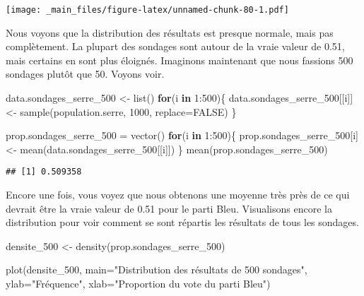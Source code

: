 \documentclass[
]{book}
\newenvironment{Shaded}{\begin{snugshade}}{\end{snugshade}}
\newcommand{\AttributeTok}[1]{\textcolor[rgb]{0.77,0.63,0.00}{#1}}
\newcommand{\ConstantTok}[1]{\textcolor[rgb]{0.00,0.00,0.00}{#1}}
\newcommand{\ControlFlowTok}[1]{\textcolor[rgb]{0.13,0.29,0.53}{\textbf{#1}}}
\newcommand{\DecValTok}[1]{\textcolor[rgb]{0.00,0.00,0.81}{#1}}
\newcommand{\FunctionTok}[1]{\textcolor[rgb]{0.00,0.00,0.00}{#1}}
\newcommand{\NormalTok}[1]{#1}
\newcommand{\OtherTok}[1]{\textcolor[rgb]{0.56,0.35,0.01}{#1}}
\newcommand{\SpecialCharTok}[1]{\textcolor[rgb]{0.00,0.00,0.00}{#1}}
\newcommand{\StringTok}[1]{\textcolor[rgb]{0.31,0.60,0.02}{#1}}
\begin{document}
\texttt{[image: \_main\_files/figure-latex/unnamed-chunk-80-1.pdf]}

Nous voyons que la distribution des résultats est presque normale, mais pas complètement. La plupart des sondages sont autour de la vraie valeur de 0.51, mais certains en sont plus éloignés. Imaginons maintenant que nous fassions 500 sondages plutôt que 50. Voyons voir.

\begin{Shaded}
\begin{Highlighting}[]
\NormalTok{data.sondages\_serre\_500 }\OtherTok{\textless{}{-}} \FunctionTok{list}\NormalTok{()}
\ControlFlowTok{for}\NormalTok{(i }\ControlFlowTok{in} \DecValTok{1}\SpecialCharTok{:}\DecValTok{500}\NormalTok{)\{}
\NormalTok{    data.sondages\_serre\_500[[i]] }\OtherTok{\textless{}{-}} \FunctionTok{sample}\NormalTok{(population.serre, }\DecValTok{1000}\NormalTok{, }\AttributeTok{replace=}\ConstantTok{FALSE}\NormalTok{)}
\NormalTok{\}}

\NormalTok{prop.sondages\_serre\_500 }\OtherTok{=} \FunctionTok{vector}\NormalTok{()}
\ControlFlowTok{for}\NormalTok{(i }\ControlFlowTok{in} \DecValTok{1}\SpecialCharTok{:}\DecValTok{500}\NormalTok{)\{}
\NormalTok{    prop.sondages\_serre\_500[i] }\OtherTok{\textless{}{-}} \FunctionTok{mean}\NormalTok{(data.sondages\_serre\_500[[i]])}
\NormalTok{\}}
\FunctionTok{mean}\NormalTok{(prop.sondages\_serre\_500)}
\end{Highlighting}
\end{Shaded}

\begin{verbatim}
## [1] 0.509358
\end{verbatim}

Encore une fois, vous voyez que nous obtenons une moyenne très près de ce qui devrait être la vraie valeur de 0.51 pour le parti Bleu. Visualisons encore la distribution pour voir comment se sont répartis les résultats de tous les sondages.

\begin{Shaded}
\begin{Highlighting}[]
\NormalTok{densite\_500 }\OtherTok{\textless{}{-}} \FunctionTok{density}\NormalTok{(prop.sondages\_serre\_500)}

\FunctionTok{plot}\NormalTok{(densite\_500, }
     \AttributeTok{main=}\StringTok{"Distribution des résultats de 500 sondages"}\NormalTok{,}
     \AttributeTok{ylab=}\StringTok{"Fréquence"}\NormalTok{,}
     \AttributeTok{xlab=}\StringTok{"Proportion du vote du parti Bleu"}\NormalTok{)}
\end{Highlighting}
\end{Shaded}
\end{document}
